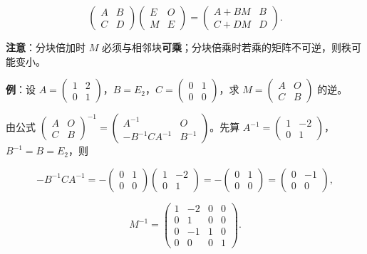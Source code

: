 \documentclass[11pt,openany,UTF8]{ctexbook}
\begin{document}
\[\begin{pmatrix}A&B\\C&D\end{pmatrix}\begin{pmatrix}E&O\\M&E\end{pmatrix}=\begin{pmatrix}A+BM&B\\C+DM&D\end{pmatrix}.\]

\textbf{注意}：分块倍加时 $M$ 必须与相邻块\textbf{可乘}；分块倍乘时若乘的矩阵不可逆，则秩可能变小。

\textbf{例}：设 $A=\begin{pmatrix}1&2\\0&1\end{pmatrix}$，$B=E_2$，$C=\begin{pmatrix}0&1\\0&0\end{pmatrix}$，求 $M=\begin{pmatrix}A&O\\C&B\end{pmatrix}$ 的逆。

由公式 $\begin{pmatrix}A&O\\C&B\end{pmatrix}^{-1}=\begin{pmatrix}A^{-1}&O\\-B^{-1}CA^{-1}&B^{-1}\end{pmatrix}$。先算 $A^{-1}=\begin{pmatrix}1&-2\\0&1\end{pmatrix}$，$B^{-1}=B=E_2$，则

\[-B^{-1}CA^{-1}=-\begin{pmatrix}0&1\\0&0\end{pmatrix}\begin{pmatrix}1&-2\\0&1\end{pmatrix}=-\begin{pmatrix}0&1\\0&0\end{pmatrix}=\begin{pmatrix}0&-1\\0&0\end{pmatrix},\]

\[M^{-1}=\begin{pmatrix}1&-2&0&0\\0&1&0&0\\0&-1&1&0\\0&0&0&1\end{pmatrix}.\]
\end{document}
